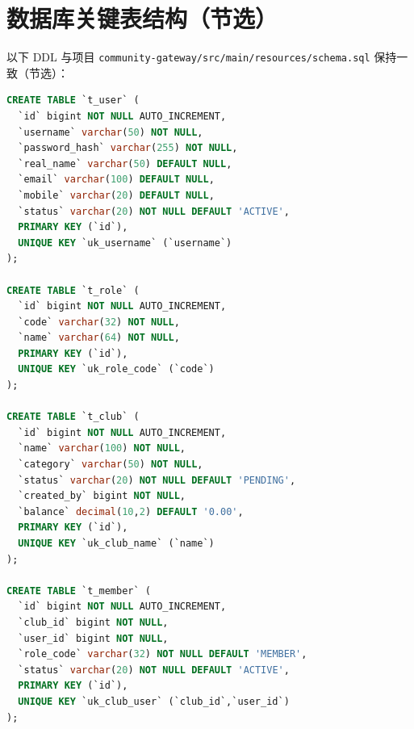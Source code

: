 \chapter{数据库关键表结构（节选）}

以下 DDL 与项目 \texttt{community-gateway/src/main/resources/schema.sql} 保持一致（节选）：

\begin{lstlisting}[language=SQL, caption=用户、角色、社团与成员表]
CREATE TABLE `t_user` (
  `id` bigint NOT NULL AUTO_INCREMENT,
  `username` varchar(50) NOT NULL,
  `password_hash` varchar(255) NOT NULL,
  `real_name` varchar(50) DEFAULT NULL,
  `email` varchar(100) DEFAULT NULL,
  `mobile` varchar(20) DEFAULT NULL,
  `status` varchar(20) NOT NULL DEFAULT 'ACTIVE',
  PRIMARY KEY (`id`),
  UNIQUE KEY `uk_username` (`username`)
);

CREATE TABLE `t_role` (
  `id` bigint NOT NULL AUTO_INCREMENT,
  `code` varchar(32) NOT NULL,
  `name` varchar(64) NOT NULL,
  PRIMARY KEY (`id`),
  UNIQUE KEY `uk_role_code` (`code`)
);

CREATE TABLE `t_club` (
  `id` bigint NOT NULL AUTO_INCREMENT,
  `name` varchar(100) NOT NULL,
  `category` varchar(50) NOT NULL,
  `status` varchar(20) NOT NULL DEFAULT 'PENDING',
  `created_by` bigint NOT NULL,
  `balance` decimal(10,2) DEFAULT '0.00',
  PRIMARY KEY (`id`),
  UNIQUE KEY `uk_club_name` (`name`)
);

CREATE TABLE `t_member` (
  `id` bigint NOT NULL AUTO_INCREMENT,
  `club_id` bigint NOT NULL,
  `user_id` bigint NOT NULL,
  `role_code` varchar(32) NOT NULL DEFAULT 'MEMBER',
  `status` varchar(20) NOT NULL DEFAULT 'ACTIVE',
  PRIMARY KEY (`id`),
  UNIQUE KEY `uk_club_user` (`club_id`,`user_id`)
);
\end{lstlisting}

